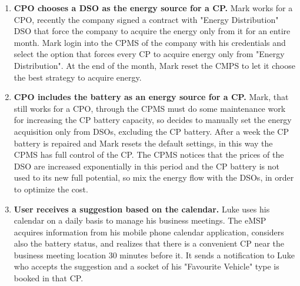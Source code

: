 \documentclass{Configuration_Files/PoliMi3i_thesis}
\begin{document}
\begin{enumerate}
    \item \textbf{CPO chooses a DSO as the energy source for a CP.} \newline
    Mark works for a CPO, recently the company signed a contract with "Energy Distribution" DSO that force the company to acquire the energy only from it for an entire month. Mark login into the CPMS of the company with his credentials and select the option that forces every CP to acquire energy only from "Energy Distribution". At the end of the month, Mark reset the CMPS to let it choose the best strategy to acquire energy.

    \item \textbf{CPO includes the battery as an energy source for a CP.} \newline
    Mark, that still works for a CPO, through the CPMS must do some maintenance work for increasing the CP battery capacity, so decides to manually set the energy acquisition only from DSOs, excluding the CP battery. After a week the CP battery is repaired and Mark resets the default settings, in this way the CPMS has full control of the CP. The CPMS notices that the prices of the DSO are increased exponentially in this period and the CP battery is not used to its new full potential, so mix the energy flow with the DSOs, in order to optimize the cost.

    \item \textbf{User receives a suggestion based on the calendar.} \newline
    Luke uses his calendar on a daily basis to manage his business meetings. The eMSP acquires information from his mobile phone calendar application, considers also the battery status, and realizes that there is a convenient CP near the business meeting location 30 minutes before it. It sends a notification to Luke who accepts the suggestion and a socket of his "Favourite Vehicle" type is booked in that CP.
\end{enumerate}
\end{document}
